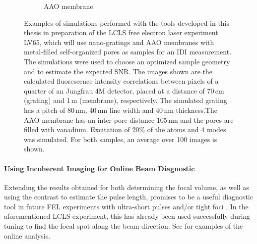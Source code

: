 \begin{figure}[p]
\begin{subfigure}[b]{0.37\textwidth}
		\caption{AAO membrane  }
		\label{fig:outlook_aao}
	\end{subfigure}
	\caption[Simulations in preparation of LCLS experiment]{Examples of simulations performed with the tools developed in this thesis in preparation of the LCLS free electron laser experiment LV65, which will use nano-gratings and AAO membranes with metal-filled self-organized pores as samples for an IDI measurement. The simulations were used to choose an optimized sample geometry and to estimate the expected SNR. The images shown are the calculated fluorescence intensity correlations between pixels of a quarter of an Jungfrau 4M detector, placed at a distance of 70\,cm (grating) and 1\,m (membrane), respectively. The simulated grating has a pitch of 80\,nm, 40\,nm line width and 40\,nm thickness.The AAO membrane has an inter pore distance 105\,nm and the pores are filled with vanadium.
		Excitation of 20\% of the atoms and 4 modes was simulated. For both samples, an average over 100 images is shown.}
\end{figure}


\paragraph{Using Incoherent Imaging for Online Beam Diagnostic}
Extending the results obtained for both determining the focal volume, as well as using the contrast to estimate the pulse length, promises to be a useful diagnostic tool in future FEL experiments with ultra-short pulses and/or tight foci \cite{nakumura2020,inoue2019}. In the aforementioned LCLS experiment, this has already been used successfully during tuning to find the focal spot along the beam direction. See  for examples of the online analysis.


